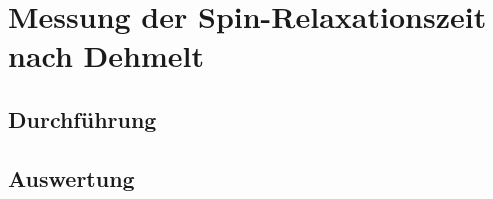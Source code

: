 \section{Messung der Spin-Relaxationszeit nach Dehmelt}
\label{sect:dehmelt}
\subsection{Durchführung}
\subsection{Auswertung}